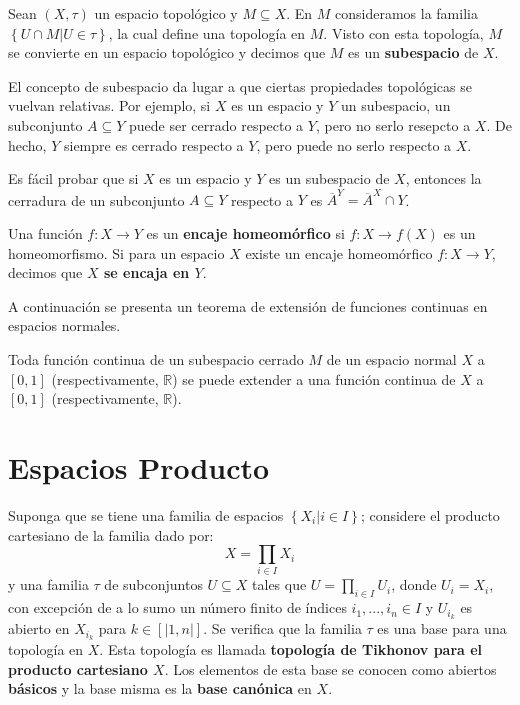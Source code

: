 \documentclass[12pt]{report}
\theoremstyle{largebreak}
\newcommand{\cf}[3]{\ensuremath{#1:#2\rightarrow#3}}
\newcommand{\natint}[1]{\ensuremath{\left[|#1|\right]}}
\begin{document}
    \begin{mydef}
        Sean $(X,\tau)$ un espacio topológico y $M\subseteq X$. En $M$ consideramos la familia $\left\{U\cap M|U\in\tau \right\}$, la cual define una topología en $M$. Visto con esta topología, $M$ se convierte en un espacio topológico y decimos que $M$ es un \textbf{subespacio} de $X$.
    \end{mydef}

    El concepto de subespacio da lugar a que ciertas propiedades topológicas se vuelvan relativas. Por ejemplo, si $X$ es un espacio y $Y$ un subespacio, un subconjunto $A\subseteq Y$ puede ser cerrado respecto a $Y$, pero no serlo resepcto a $X$. De hecho, $Y$ siempre es cerrado respecto a $Y$, pero puede no serlo respecto a $X$.

    Es fácil probar que si $X$ es un espacio y $Y$ es un subespacio de $X$, entonces la cerradura de un subconjunto $A\subseteq Y$ respecto a $Y$ es $\overline{A}^{Y}=\overline{A}^X\cap Y$.

    \begin{mydef}
        Una función $\cf{f}{X}{Y}$ es un \textbf{encaje homeomórfico} si $\cf{f}{X}{f(X)}$ es un homeomorfismo. Si para un espacio $X$ existe un encaje homeomórfico $\cf{f}{X}{Y}$, decimos que \textbf{$X$ se encaja en $Y$}.
    \end{mydef}

    A continuación se presenta un teorema de extensión de funciones continuas en espacios normales.

    \begin{theor}
        Toda función continua de un subespacio cerrado $M$ de un espacio normal $X$ a $[0,1]$ (respectivamente, $\mathbb{R}$) se puede extender a una función continua de $X$ a $[0,1]$ (respectivamente, $\mathbb{R}$).
    \end{theor}

    \section{Espacios Producto}

    Suponga que se tiene una familia de espacios $\left\{X_i|i\in I \right\}$; considere el producto cartesiano de la familia dado por:
    \begin{equation*}
        X=\prod_{i\in I}X_i
    \end{equation*}
    y una familia $\tau$ de subconjuntos $U\subseteq X$ tales que $U=\prod_{i\in I}U_i$, donde $U_i= X_i$, con excepción de a lo sumo un número finito de índices $i_1,...,i_n\in I$ y $U_{i_k}$ es abierto en $X_{i_k}$ para $k\in\natint{1,n}$. Se verifica que la familia $\tau$ es una base para una topología en $X$. Esta topología es llamada \textbf{topología de Tikhonov para el producto cartesiano $X$}. Los elementos de esta base se conocen como abiertos \textbf{básicos} y la base misma es la \textbf{base canónica} en $X$.
\end{document}
